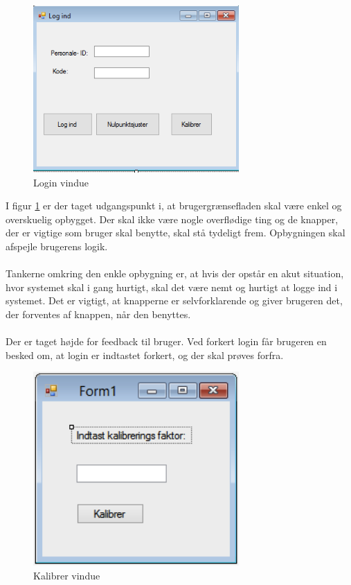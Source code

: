 \begin{figure}[H]
	\centering
	\includegraphics[width=0.7\textwidth]{Figurer/GUI/Logind_GUI}
	\caption{Login vindue}
	\label{Login vindue}
\end{figure}

I figur \ref{Login vindue} er der taget udgangspunkt i, at brugergrænsefladen skal være enkel og overskuelig opbygget. Der skal ikke være nogle overflødige ting og de knapper, der er vigtige som bruger skal benytte, skal stå tydeligt frem. Opbygningen skal afspejle brugerens logik.\\ \\ 
Tankerne omkring den enkle opbygning er, at hvis der opstår en akut situation, hvor systemet skal i gang hurtigt, skal det være nemt og hurtigt at logge ind i systemet. Det er vigtigt, at knapperne er selvforklarende og giver brugeren det, der forventes af knappen, når den benyttes. \\ \\
Der er taget højde for feedback til bruger. Ved forkert login får brugeren en besked om, at login er indtastet forkert, og der skal prøves forfra. \\


\begin{figure}[H]
	\centering
	\includegraphics[width=0.7\textwidth]{Figurer/GUI/kalibrerGUI}
	\caption{Kalibrer vindue}
	\label{Kaliber vindue}
\end{figure}


